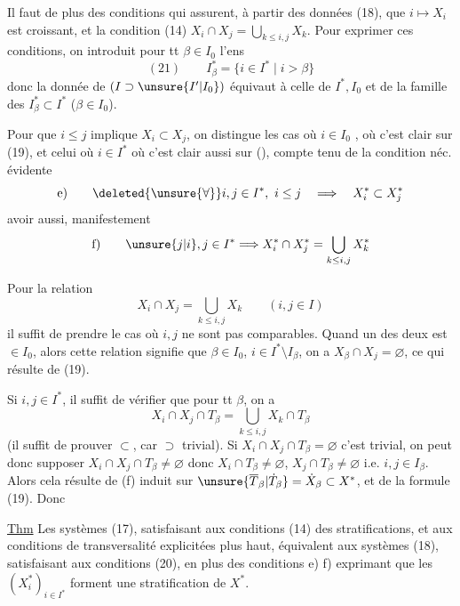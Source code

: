 Il faut de plus des conditions qui assurent,
à partir des données (18), que $i\mapsto X_i$
est croissant, et  la condition (14)
$X_i\cap X_j=\bigcup_{k\le i,j}X_k$. Pour  exprimer ces conditions,
on introduit pour tt $\beta\in I_0$ l'ens
\[
(21)\qquad I_\beta^*=\{i\in I^*\mid i>\beta\}
\]
donc la donnée de $(I\supset\unsure{I'|I_0})$
 équivaut à celle
de $I^*,I_0$  et de la famille des
$I_\beta^*\subset I^*$ ($\beta\in I_0$).

Pour  que 
$i\le j$  implique $X_i\subset X_j$,
on distingue les cas où $i\in I_0$\inserted{$=\beta$}
, où c'est
clair sur (19), et celui où $i\in I^*$ où  c'est
clair aussi sur (), compte tenu de la condition
néc. évidente
\[
\text{e)}\qquad \deleted{\unsure{\forall}} i,j\in I^*,\ i\le j
\quad\Longrightarrow\quad X_i^*\subset X_j^*
\]
 avoir aussi, manifestement
\[
\text{f)}\qquad \unsure{j|i},j\in I^*\Longrightarrow
X_i^*\cap X_j^*=\bigcup_{k\le i,j}X_k^*
\]

Pour la relation
\[
X_i\cap X_j=\bigcup_{k\le i,j}X_k\qquad(i,j\in I)
\]
il  suffit de prendre le cas où $i,j$ ne
sont pas comparables. Quand un des deux
est $\in I_0$, alors cette relation  signifie que
$\beta\in I_0$, $i\in I^*\setminus I_\beta$, on a
$X_\beta\cap X_j=\varnothing$, ce qui résulte de (19).

Si $i,j\in I^*$, il suffit 
de vérifier que pour tt
$\beta$, on a
\[
X_i\cap X_j\cap T_\beta=\bigcup_{k\le i,j}X_k\cap T_\beta
\]
(il suffit de prouver $\subset$, car $\supset$ trivial). Si
$X_i\cap X_j\cap T_\beta=\varnothing$ c'est trivial, on peut donc supposer
$X_i\cap X_j\cap T_\beta\ne\varnothing$
donc $X_i\cap T_\beta\ne\varnothing$, $X_j\cap T_\beta\ne\varnothing$
i.e. $i,j\in I_\beta$. Alors  cela résulte de
(f) induit sur $\unsure{\overline T_\beta|\dot T_\beta}=\dot X_\beta\subset X^*$,
et de la formule (19). Donc

\uline{Thm} Les systèmes (17), satisfaisant aux
conditions  (14) des stratifications, et aux
conditions de transversalité explicitées plus
haut, équivalent aux systèmes (18), satisfaisant
aux conditions (20), en plus des conditions
e) f) exprimant que les $(X_i^*)_{i\in I^*}$ forment une
stratification de $X^*$.

